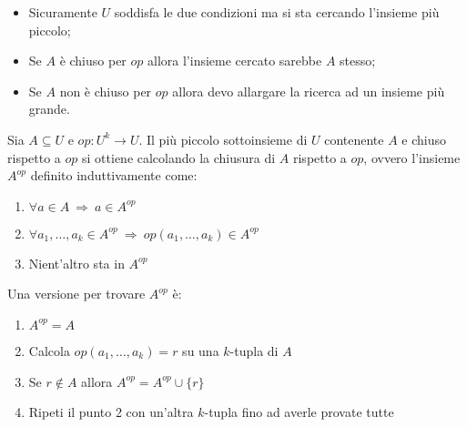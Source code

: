 \begin{itemize}
    \item Sicuramente $U$ soddisfa le due condizioni ma {\color{red}si sta cercando
        l'insieme più piccolo};
    \item Se $A$ è chiuso per $op$ allora l'insieme cercato sarebbe $A$ stesso;
    \item Se $A$ non è chiuso per $op$ allora devo {\color{blue} allargare la ricerca ad 
        un insieme più grande}.
\end{itemize}
\vspace{.5em}
\begin{theorem}
    Sia $A\subseteq U$ e $op:U^k\to U$. Il più piccolo sottoinsieme di $U$ contenente $A$
    e chiuso rispetto a $op$ si ottiene calcolando la chiusura di $A$ rispetto a $op$, ovvero
    l'insieme $A^{op}$ definito induttivamente come:
    \begin{enumerate}
        \item $\forall a\in A \ \Rightarrow \ a\in A^{op}$
        \item $\forall a_1,\dots,a_k\in A^{op} \ \Rightarrow \ op(a_1,\dots,a_k)\in A^{op}$
        \item Nient'altro sta in $A^{op}$
    \end{enumerate}
\end{theorem}

Una versione  per trovare $A^{op}$ è:
\begin{enumerate}
    \item $A^{op} = A$
    \item Calcola $op(a_1,\dots,a_k)=r$ su una $k$-tupla di $A$
    \item Se $r\notin A$ allora $A^{op} = A^{op}\cup\{r\}$
    \item Ripeti il punto 2 con un'altra $k$-tupla fino ad averle provate tutte
\end{enumerate}